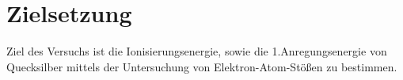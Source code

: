 
\section{Zielsetzung}
\label{sec:Zielsetzung}

Ziel des Versuchs ist die Ionisierungsenergie, sowie die 1.Anregungsenergie von Quecksilber mittels der Untersuchung von Elektron-Atom-Stößen zu bestimmen.